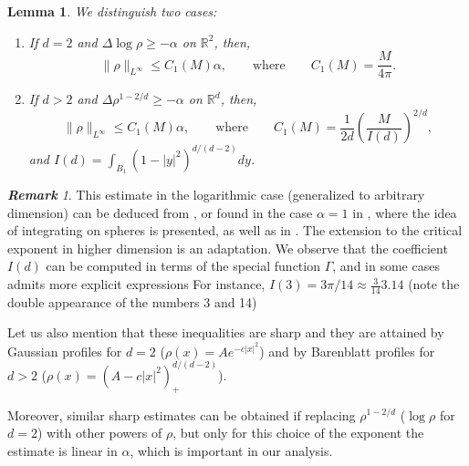 \documentclass[11pt,a4paper]{article}
\numberwithin{equation}{section}
\newcommand{\R}{{\mathbb{R}}}
\theoremstyle{plain}
\newtheorem{lemma}[theorem]{Lemma}
\theoremstyle{remark}
\newtheorem{remark}[theorem]{\bf Remark}
\newcommand {\f}{\frac}
\begin{document}
\begin{lemma}\label{lem:Naive Linfty} We distinguish two cases:
\begin{enumerate}
    \item If $d=2$ and $\Delta \log \rho \geq -\alpha$ on $\R^2$, then,
    $$
    \|\rho\|_{L^\infty} \leq C_1(M)\alpha,
    \qquad\text{where}\qquad
    C_1(M) = \f{M}{4\pi}.
    $$
    \item If $d>2$ and $\Delta \rho^{1-2/d} \geq -\alpha$ on $\R^d$, then,
    $$
    \|\rho\|_{L^\infty} \leq C_1(M)\alpha,
    \qquad\text{where}\qquad
    C_1(M) = \f{1}{2d}\left(\f{M}{I(d)}\right)^{2/d},
    $$
    and $I(d)=\int_{B_1} (1-|y|^2)^{d/(d-2)}dy$.
\end{enumerate}
\end{lemma}
\begin{remark}
    This estimate in the logarithmic case (generalized to arbitrary dimension) can be deduced from \cite[Theorem 1.16]{dePhilippis_Shenfeld25},  or found in the case $\alpha=1$ in \cite[Lemma 3.7]{GraKemLoeZak}, where the idea of integrating on spheres is presented, as well as in \cite{FanchPhD}. The extension to the critical exponent in higher dimension is an adaptation. We observe that the coefficient $I(d)$ can be computed in terms of the special function $\Gamma$, and in some cases admits more explicit expressions For instance, $I(3)=3\pi/14\approx \f{3}{14}3.14$ (note the double appearance of the numbers 3 and 14)

Let us also mention that these inequalities are sharp and they are attained by Gaussian profiles for $d=2$ ($\rho(x)=Ae^{-c|x|^2}$) and by Barenblatt profiles for $d>2$ ($\rho(x)=(A-c|x|^2)_+^{d/(d-2)}$).

Moreover, similar sharp estimates can be obtained if replacing $\rho^{1-2/d}$ ($\log\rho$ for $d=2$) with other powers of $\rho$, but only for this choice of the exponent the estimate is linear in $\alpha$, which is important in our analysis.
    
\end{remark}
\end{document}
